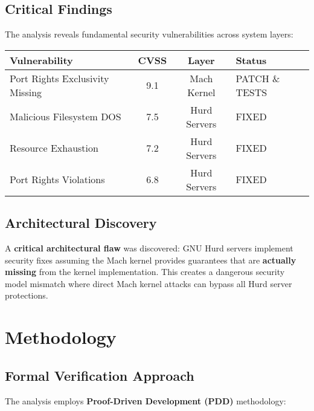 \documentclass[11pt,a4paper]{article}
\begin{document}
\subsection{Critical Findings}

The analysis reveals fundamental security vulnerabilities across system layers:

\begin{center}
\begin{tabular}{|l|c|c|l|}
\hline
\textbf{Vulnerability} & \textbf{CVSS} & \textbf{Layer} & \textbf{Status} \\
\hline
\textcolor{criticalred}{Port Rights Exclusivity Missing} & \textcolor{criticalred}{9.1} & Mach Kernel & \textcolor{successgreen}{PATCH \& TESTS} \\
Malicious Filesystem DOS & 7.5 & Hurd Servers & \textcolor{successgreen}{FIXED} \\
Resource Exhaustion & 7.2 & Hurd Servers & \textcolor{successgreen}{FIXED} \\
Port Rights Violations & 6.8 & Hurd Servers & \textcolor{successgreen}{FIXED} \\
\hline
\end{tabular}
\end{center}

\subsection{Architectural Discovery}

A \textbf{critical architectural flaw} was discovered: GNU Hurd servers implement security fixes assuming the Mach kernel provides guarantees that are \textbf{actually missing} from the kernel implementation. This creates a dangerous security model mismatch where direct Mach kernel attacks can bypass all Hurd server protections.

\section{Methodology}

\subsection{Formal Verification Approach}

The analysis employs \textbf{Proof-Driven Development (PDD)} methodology:
\end{document}
